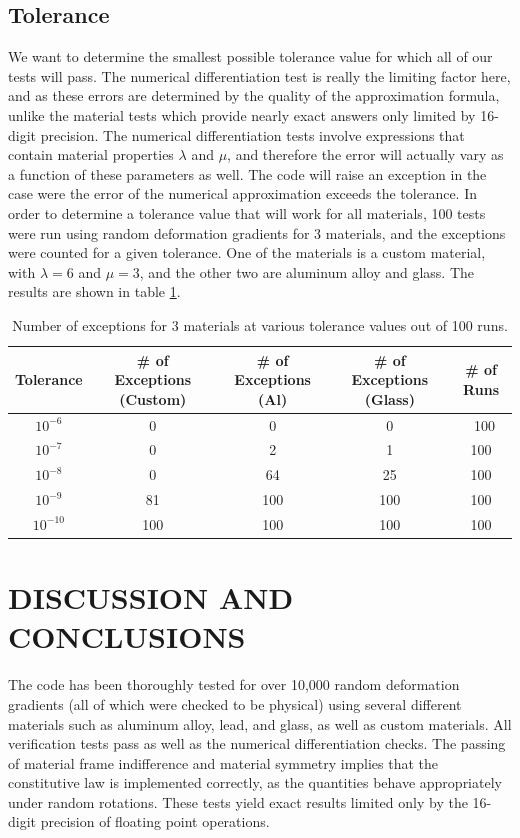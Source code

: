 \documentclass[]{spie}  %
\newcommand\Tstrut{\rule{0pt}{2.6ex}}         %
\begin{document}
\subsection{Tolerance}
We want to determine the smallest possible tolerance value for which all of our tests will pass. The numerical differentiation test is really the limiting factor here, and as these errors are determined by the quality of the approximation formula, unlike the material tests which provide nearly exact answers only limited by 16-digit precision. The numerical differentiation tests involve expressions that contain material properties $\lambda$ and $\mu$, and therefore the error will actually vary as a function of these parameters as well. The code will raise an exception in the case were the error of the numerical approximation exceeds the tolerance. In order to determine a tolerance value that will work for all materials, 100 tests were run using random deformation gradients for 3 materials, and the exceptions were counted for a given tolerance. One of the materials is a custom material, with $\lambda = 6$ and $\mu = 3$, and the other two are aluminum alloy and glass. The results are shown in table \ref{table: tolerance}. 

\begin{table}[h]
	\centering
	\caption{Number of exceptions for 3 materials at various tolerance values out of 100 runs.}
	\begin{tabular}{ | c | c | c | c | c |}
		\hline
		Tolerance  & \# of Exceptions (Custom) & \# of Exceptions (Al) & \# of Exceptions (Glass) & \# of Runs \Tstrut \\ \hline
		$10^{-6}$  & 0   & 0   & 0   & \ 100 \Tstrut \\
		$10^{-7}$  & 0   & 2   & 1   & 100 \\
		$10^{-8}$  & 0   & 64  & 25  & 100 \\
		$10^{-9}$  & 81  & 100 & 100 & 100 \\
		$10^{-10}$ & 100 & 100 & 100 & 100 \\
		\hline
	\end{tabular}
	\label{table: tolerance}
\end{table}

\section{DISCUSSION AND CONCLUSIONS}
\label{sec: discussion}

The code has been thoroughly tested for over 10,000 random deformation gradients (all of which were checked to be physical) using several different materials such as aluminum alloy, lead, and glass, as well as custom materials. All verification tests pass as well as the numerical differentiation checks. The passing of material frame indifference and material symmetry implies that the constitutive law is implemented correctly, as the quantities behave appropriately under random rotations. These tests yield exact results limited only by the 16-digit precision of floating point operations. 
\end{document}
